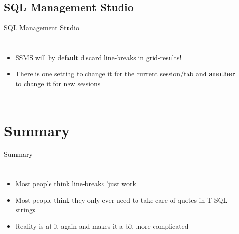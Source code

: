 \documentclass[english,aspectratio=169]{beamer}
\begin{document}
\subsection[SSMS]{SQL Management Studio}
\begin{frame}{SQL Management Studio}
\begin{columns}
        \begin{itemize}
        \item SSMS will by default discard line-breaks in grid-results!
        \item<2-> There is one setting to change it for the current session/tab and \textbf{another} to change it for new sessions
        \end{itemize}
        \begin{center}
        \end{center}
    \end{columns}
\end{frame}

\section{Summary}

\begin{frame}{Summary}
\begin{columns}
    \begin{itemize}
        \item Most people think line-breaks 'just work'
        \item Most people think they only ever need to take care of quotes in T-SQL-strings
        \item Reality is at it again and makes it a bit more complicated
    \end{itemize}
        \begin{center}
        \end{center}
\end{columns}
\end{frame}
\end{document}
